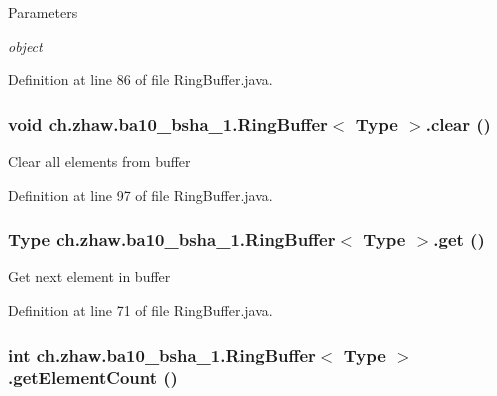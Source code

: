 \begin{DoxyParams}{Parameters}
\item[{\em object}]\end{DoxyParams}


Definition at line 86 of file RingBuffer.java.\hypertarget{classch_1_1zhaw_1_1ba10__bsha__1_1_1RingBuffer_3_01Type_01_4_acab4ce43532969d02efd5f3b64412ead}{
\subsubsection[{clear}]{\setlength{\rightskip}{0pt plus 5cm}void ch.zhaw.ba10\_\-bsha\_\-1.RingBuffer$<$ Type $>$.clear ()}}
\label{classch_1_1zhaw_1_1ba10__bsha__1_1_1RingBuffer_3_01Type_01_4_acab4ce43532969d02efd5f3b64412ead}
Clear all elements from buffer 

Definition at line 97 of file RingBuffer.java.\hypertarget{classch_1_1zhaw_1_1ba10__bsha__1_1_1RingBuffer_3_01Type_01_4_a8e0a51acf2fd13ad7e935583bd7b386a}{
\subsubsection[{get}]{\setlength{\rightskip}{0pt plus 5cm}Type ch.zhaw.ba10\_\-bsha\_\-1.RingBuffer$<$ Type $>$.get ()}}
\label{classch_1_1zhaw_1_1ba10__bsha__1_1_1RingBuffer_3_01Type_01_4_a8e0a51acf2fd13ad7e935583bd7b386a}
Get next element in buffer 

Definition at line 71 of file RingBuffer.java.\hypertarget{classch_1_1zhaw_1_1ba10__bsha__1_1_1RingBuffer_3_01Type_01_4_a0e958d4d07b0d8d782036b0593b80cb8}{
\subsubsection[{getElementCount}]{\setlength{\rightskip}{0pt plus 5cm}int ch.zhaw.ba10\_\-bsha\_\-1.RingBuffer$<$ Type $>$.getElementCount ()}}
\label{classch_1_1zhaw_1_1ba10__bsha__1_1_1RingBuffer_3_01Type_01_4_a0e958d4d07b0d8d782036b0593b80cb8}



